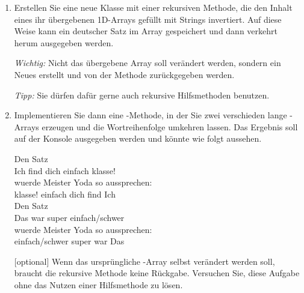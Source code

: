 \documentclass{bschlangaul-aufgabe}
\begin{document}
\begin{enumerate}

%

\item Erstellen Sie eine neue Klasse  mit
einer rekursiven Methode, die den Inhalt eines ihr übergebenen 1D-Arrays
gefüllt mit Strings invertiert. Auf diese Weise kann \zB ein deutscher
Satz im Array gespeichert und dann verkehrt herum ausgegeben werden.

\emph{Wichtig:} Nicht das übergebene Array soll verändert werden,
sondern ein Neues erstellt und von der Methode zurückgegeben werden.

\emph{Tipp:} Sie dürfen dafür gerne auch rekursive Hilfsmethoden
benutzen.

%

\item Implementieren Sie dann eine -Methode, in der Sie
zwei verschieden lange -Arrays erzeugen und die
Wortreihenfolge umkehren lassen. Das Ergebnis soll auf der Konsole
ausgegeben werden und könnte \zB wie folgt aussehen.

\bigskip

{
\ttfamily
Den Satz\\
Ich find dich einfach klasse!\\
wuerde Meister Yoda so aussprechen:\\
klasse! einfach dich find Ich\\

Den Satz\\
Das war super einfach/schwer\\
wuerde Meister Yoda so aussprechen:\\
einfach/schwer super war Das
}

\bigskip

[optional] Wenn das ursprüngliche -Array selbst
verändert werden soll, braucht die rekursive Methode keine Rückgabe.
Versuchen Sie, diese Aufgabe ohne das Nutzen einer Hilfsmethode zu
lösen.

\begin{bAntwort}
\end{bAntwort}
\end{enumerate}
\end{document}
